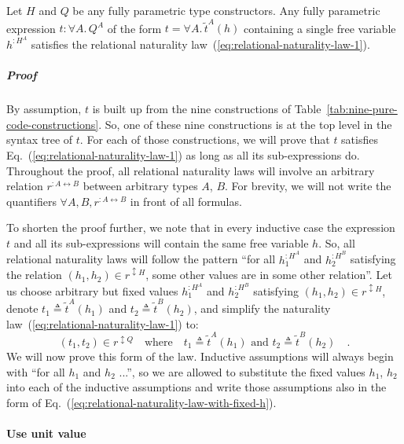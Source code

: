 Let $H$ and $Q$ be any fully parametric type constructors. Any fully
parametric expression $t:\forall A.\,Q^{A}$ of the form $t=\forall A.\,\tilde{t}^{A}(h)$
containing a single free variable $h^{:H^{A}}$ satisfies the relational
naturality law~(\ref{eq:relational-naturality-law-1}).

\subparagraph{Proof }

By assumption, $t$ is built up from the nine constructions of Table~\ref{tab:nine-pure-code-constructions}.
So, one of these nine constructions is at the top level in the syntax
tree of $t$. For each of those constructions, we will prove that
$t$ satisfies Eq.~(\ref{eq:relational-naturality-law-1}) as long
as all its sub-expressions do. Throughout the proof, all relational
naturality laws will involve an arbitrary relation $r^{:A\leftrightarrow B}$
between arbitrary types $A$, $B$. For brevity, we will not write
the quantifiers $\forall A,B,r^{:A\leftrightarrow B}$ in front of
all formulas.

To shorten the proof further, we note that in every inductive case
the expression $t$ and all its sub-expressions will contain the same
free variable $h$. So, all relational naturality laws will follow
the pattern \textsf{``}for all $h_{1}^{:H^{A}}$ and $h_{2}^{:H^{B}}$ satisfying
the relation $(h_{1},h_{2})\in r^{\updownarrow H}$, some other values
are in some other relation\textsf{''}. Let us choose arbitrary but fixed values
$h_{1}^{:H^{A}}$ and $h_{2}^{:H^{B}}$ satisfying $(h_{1},h_{2})\in r^{\updownarrow H}$,
denote $t_{1}\triangleq\tilde{t}^{A}(h_{1})$ and $t_{2}\triangleq\tilde{t}^{B}(h_{2})$,
and simplify the naturality law~(\ref{eq:relational-naturality-law-1})
to:
\begin{equation}
(t_{1},t_{2})\in r^{\updownarrow Q}\quad\text{where}\quad t_{1}\triangleq\tilde{t}^{A}(h_{1})\text{ and }t_{2}\triangleq\tilde{t}^{B}(h_{2})\quad.\label{eq:relational-naturality-law-with-fixed-h}
\end{equation}
We will now prove this form of the law. Inductive assumptions will
always begin with \textsf{``}for all $h_{1}$ and $h_{2}$ ...\textsf{''}, so we are
allowed to substitute the fixed values $h_{1}$, $h_{2}$ into each
of the inductive assumptions and write those assumptions also in the
form of Eq.~(\ref{eq:relational-naturality-law-with-fixed-h}).

\paragraph{Use unit value}

